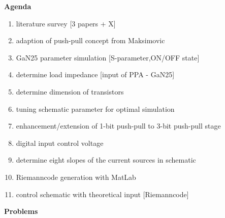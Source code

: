 \textbf{Agenda}
\begin{enumerate}
	\item literature survey [3 papers + X]
	\item adaption of push-pull concept from Maksimovic
	\item GaN25 parameter simulation [S-parameter,ON/OFF state]
	\item determine load impedance [input of PPA - GaN25]
	\item determine dimension of transistors
	\item tuning schematic parameter for optimal simulation
	\item enhancement/extension of 1-bit push-pull to 3-bit push-pull stage
	\item digital input control voltage
	\item determine eight slopes of the current sources in schematic
	\item Riemanncode generation with MatLab
	\item control schematic with theoretical input [Riemanncode]
\end{enumerate}
\vspace{2cm}
\textbf{Problems}
